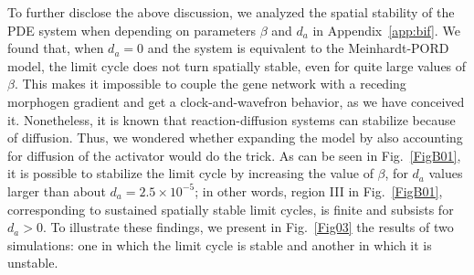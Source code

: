 \documentclass[%
 preprint,
 aip, 
 amsmath,amssymb,
]{revtex4-2}
\begin{document}
To further disclose the above discussion, we analyzed the spatial stability of the PDE system when depending on parameters $\beta$ and $d_a$ in Appendix~\ref{app:bif}. We found that, when $d_a = 0$ and the system is equivalent to the Meinhardt-PORD model, the limit cycle does not turn spatially stable, even for quite large values of $\beta$. This makes it impossible to couple the gene network with a receding morphogen gradient and get a clock-and-wavefron behavior, as we have conceived it. Nonetheless, it is known that reaction-diffusion systems can stabilize because of diffusion. Thus, we wondered whether expanding the model by also accounting for diffusion of the activator would do the trick. As can be seen in Fig.~\ref{FigB01}, it is possible to stabilize the limit cycle by increasing the value of $\beta$, for $d_a$ values larger than about $d_a=2.5\times10^{-5}$; in other words, region III in Fig.~\ref{FigB01},  corresponding to sustained spatially stable limit cycles, is finite and subsists for $d_a>0$. To illustrate these findings, we present in Fig.~\ref{Fig03} the results of two simulations: one in which the limit cycle is stable and another in which it is unstable. 
\end{document}
